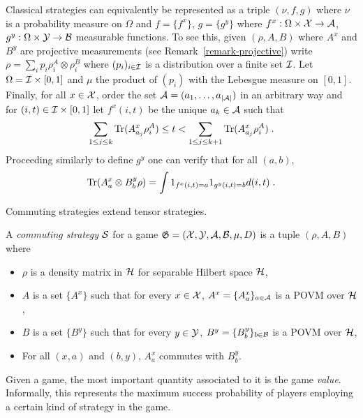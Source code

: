 \begin{remark}
Classical strategies can equivalently be represented as a triple $(\nu,f,g)$ where $\nu$ is a probability measure on $\Omega$ and $f=\{f^x\}$, $g=\{g^y\}$ where $f^x:\Omega\times \cal{X}\to\cal{A}$, $g^y: \Omega\times \cal{Y}\to \cal{B}$ measurable functions. To see this, given $(\rho,A,B)$ where $A^x$ and $B^y$ are projective measurements (see Remark~\ref{remark-projective}) write $\rho = \sum_i p_i \rho^A_i \otimes \rho^B_i$ where $(p_i)_{i\in \cal{I}}$ is a distribution over a finite set $\cal{I}$. Let $\Omega = \cal{I} \times [0,1]$ and $\mu$ the product of $(p_i)$ with the Lebesgue measure on $[0,1]$. Finally, for all $x\in \cal{X}$, order the set $\cal{A}=(a_1,\ldots,a_{|\cal{A}|})$ in an arbitrary way and for $(i,t)\in\cal{I}\times [0,1]$ let $f^x(i,t)$ be the unique $a_k\in \cal{A}$ such that 
\[ \sum_{1\leq j \leq k}  \Tr(A^x_{a_j} \rho_i^A) \leq t < \sum_{1\leq j \leq k+1}  \Tr(A^x_{a_j} \rho_i^A) \;.\]
Proceeding similarly to define $g^y$ one can verify that for all $(a,b)$, 
\[\Tr(A^x_a \otimes B^y_b \rho) = \int 1_{f^x(i,t)=a} 1_{g^y(i,t)=b}d(i,t)\;.\] 
\end{remark}

Commuting strategies extend tensor strategies. 

\begin{definition}
  \label{definition-commutingstrategy}
  A \emph{commuting strategy} $\strategy$ for a game $\game = (\cal{X},
  \cal{Y}, \cal{A}, \cal{B}, \mu, D)$ is a tuple $(\rho, A, B)$ where
  \begin{itemize}
	\item $\rho$ is a density matrix in $\mH$ for separable Hilbert space $\mH$,
	\item $A$ is a set $\{A^x\}$ such that for every $x \in \cal{X}$, $A^x =
    \{A^x_a \}_{a \in \cal{A}}$ is a POVM over $\mH$, 
	\item $B$ is a set $\{B^y\}$ such that for every $y \in \cal{Y}$, $B^y =
    \{B^y_b \}_{b \in \cal{B}}$ is a POVM over $\mH$,
		\item For all $(x,a)$ and $(b,y)$, $A^x_a$ commutes with $B^y_b$. 
\end{itemize}
\end{definition}


Given a game, the most important quantity associated to it is the game \emph{value}. Informally, this represents the maximum success probability of players employing a certain kind of strategy in the game.  

